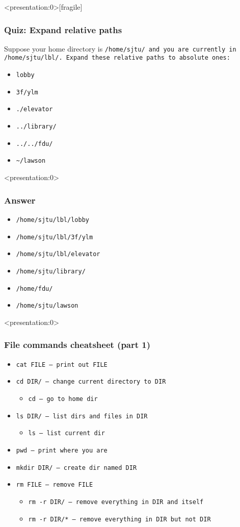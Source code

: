 \begin{frame}<presentation:0>[fragile]
\frametitle{Quiz: Expand relative paths}
Suppose your home directory is \tt{/home/sjtu/} and you are currently in
\tt{/home/sjtu/lbl/}. Expand these relative paths to absolute ones:
\begin{itemize}
    \item \tt{lobby}
    \item \tt{3f/ylm}
    \item \tt{./elevator}
    \item \tt{../library/}
    \item \tt{../../fdu/}
    \item \verb|~/lawson| %
\end{itemize}
\end{frame}

\begin{frame}<presentation:0> %
\frametitle{Answer}
\begin{itemize}
    \item \tt{/home/sjtu/lbl/lobby}
    \item \tt{/home/sjtu/lbl/3f/ylm}
    \item \tt{/home/sjtu/lbl/elevator}
    \item \tt{/home/sjtu/library/}
    \item \tt{/home/fdu/}
    \item \tt{/home/sjtu/lawson}
\end{itemize}
\end{frame}

\begin{frame}<presentation:0>
\frametitle{File commands cheatsheet (part 1)}
\begin{itemize}
    \item \tt{cat FILE} — print out FILE
    \item \tt{cd DIR/} — change current directory to DIR
    \begin{itemize}
        \item \tt{cd} — go to home dir
    \end{itemize}
    \item \tt{ls DIR/} — list dirs and files in DIR
    \begin{itemize}
        \item \tt{ls} — list current dir
    \end{itemize}
    \item \tt{pwd} — print where you are
    \item \tt{mkdir DIR/} — create dir named DIR
    \item \tt{rm FILE} — remove FILE
    \begin{itemize}
        \item \tt{rm -r DIR/} — remove everything in DIR and itself
        \item \tt{rm -r DIR/*} — remove everything in DIR but not DIR
    \end{itemize}
\end{itemize}
\end{frame}

